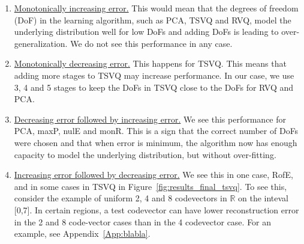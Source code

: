 \begin{enumerate}
\item \underline{Monotonically increasing error.}  This would mean that the degrees of freedom (DoF) in the learning algorithm, such as PCA, TSVQ and RVQ, model the underlying distribution well for low DoFs and adding DoFs is leading to over-generalization.  We do not see this performance in any case.
\item \underline{Monotonically decreasing error.}  This happens for TSVQ.  This means that adding more stages to TSVQ may increase performance.  In our case, we use 3, 4 and 5 stages to keep the DoFs in TSVQ close to the DoFs for RVQ and PCA.
\item \underline{Decreasing error followed by increasing error.}  We see this performance for PCA, maxP, nulE and monR.  This is a sign that the correct number of DoFs were chosen and that when error is minimum, the algorithm now has enough capacity to model the underlying distribution, but without over-fitting.
\item \underline{Increasing error followed by decreasing error.}  We see this in one case, RofE, and in some cases in TSVQ in Figure~\ref{fig:results_final_tsvq}.  To see this, consider the example of uniform 2, 4 and 8 codevectors in $\mathbb{R}$ on the inteval [0,7].  In certain regions, a test codevector can have lower reconstruction error in the 2 and 8 code-vector cases than in the 4 codevector case.  For an example, see Appendix~\ref{App:blabla}.


\end{enumerate}

%



